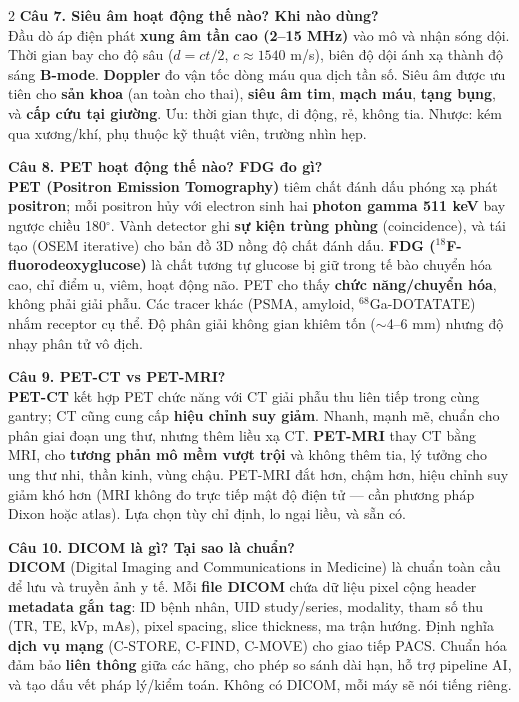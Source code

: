 \begin{paracol}{2}
\textbf{Câu 7. Siêu âm hoạt động thế nào? Khi nào dùng?}\\
Đầu dò áp điện phát \textbf{xung âm tần cao (2--15 MHz)} vào mô và nhận sóng dội. Thời gian bay cho độ sâu ($d = ct/2$, $c \approx 1540$ m/s), biên độ dội ánh xạ thành độ sáng \textbf{B-mode}. \textbf{Doppler} đo vận tốc dòng máu qua dịch tần số. Siêu âm được ưu tiên cho \textbf{sản khoa} (an toàn cho thai), \textbf{siêu âm tim}, \textbf{mạch máu}, \textbf{tạng bụng}, và \textbf{cấp cứu tại giường}. Ưu: thời gian thực, di động, rẻ, không tia. Nhược: kém qua xương/khí, phụ thuộc kỹ thuật viên, trường nhìn hẹp.

\textbf{Câu 8. PET hoạt động thế nào? FDG đo gì?}\\
\textbf{PET (Positron Emission Tomography)} tiêm chất đánh dấu phóng xạ phát \textbf{positron}; mỗi positron hủy với electron sinh hai \textbf{photon gamma 511 keV} bay ngược chiều 180$^\circ$. Vành detector ghi \textbf{sự kiện trùng phùng} (coincidence), và tái tạo (OSEM iterative) cho bản đồ 3D nồng độ chất đánh dấu. \textbf{FDG ($^{18}$F-fluorodeoxyglucose)} là chất tương tự glucose bị giữ trong tế bào chuyển hóa cao, chỉ điểm u, viêm, hoạt động não. PET cho thấy \textbf{chức năng/chuyển hóa}, không phải giải phẫu. Các tracer khác (PSMA, amyloid, $^{68}$Ga-DOTATATE) nhắm receptor cụ thể. Độ phân giải không gian khiêm tốn ($\sim$4--6 mm) nhưng độ nhạy phân tử vô địch.

\textbf{Câu 9. PET-CT vs PET-MRI?}\\
\textbf{PET-CT} kết hợp PET chức năng với CT giải phẫu thu liên tiếp trong cùng gantry; CT cũng cung cấp \textbf{hiệu chỉnh suy giảm}. Nhanh, mạnh mẽ, chuẩn cho phân giai đoạn ung thư, nhưng thêm liều xạ CT. \textbf{PET-MRI} thay CT bằng MRI, cho \textbf{tương phản mô mềm vượt trội} và không thêm tia, lý tưởng cho ung thư nhi, thần kinh, vùng chậu. PET-MRI đắt hơn, chậm hơn, hiệu chỉnh suy giảm khó hơn (MRI không đo trực tiếp mật độ điện tử --- cần phương pháp Dixon hoặc atlas). Lựa chọn tùy chỉ định, lo ngại liều, và sẵn có.

\textbf{Câu 10. DICOM là gì? Tại sao là chuẩn?}\\
\textbf{DICOM} (Digital Imaging and Communications in Medicine) là chuẩn toàn cầu để lưu và truyền ảnh y tế. Mỗi \textbf{file DICOM} chứa dữ liệu pixel cộng header \textbf{metadata gắn tag}: ID bệnh nhân, UID study/series, modality, tham số thu (TR, TE, kVp, mAs), pixel spacing, slice thickness, ma trận hướng. Định nghĩa \textbf{dịch vụ mạng} (C-STORE, C-FIND, C-MOVE) cho giao tiếp PACS. Chuẩn hóa đảm bảo \textbf{liên thông} giữa các hãng, cho phép so sánh dài hạn, hỗ trợ pipeline AI, và tạo dấu vết pháp lý/kiểm toán. Không có DICOM, mỗi máy sẽ nói tiếng riêng.


\end{paracol}
